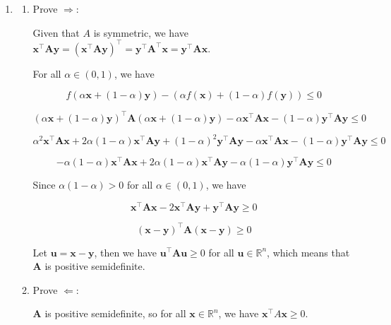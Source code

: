 \documentclass[10pt,a4paper]{article}
\begin{document}
\begin{enumerate}
    \item[1. ]
    \begin{enumerate}
        \item[] Prove $\Rightarrow$:
        
        Given that $A$ is symmetric, we have
        $\mathbf{x}^\top \mathbf{A} \mathbf{y}
        = (\mathbf{x}^\top \mathbf{A} \mathbf{y})^\top
        = \mathbf{y}^\top \mathbf{A}^\top \mathbf{x}
        = \mathbf{y}^\top \mathbf{A} \mathbf{x}$.

        For all $\alpha \in (0, 1)$, we have

        $$
        f(\alpha\mathbf{x}+(1-\alpha)\mathbf{y}) - (\alpha f(\mathbf{x})+(1-\alpha)f(\mathbf{y})) \leq 0
        $$

        $$
        (\alpha\mathbf{x}+(1-\alpha)\mathbf{y})^\top\mathbf{A}(\alpha\mathbf{x}+(1-\alpha)\mathbf{y}) - \alpha \mathbf{x}^\top\mathbf{A}\mathbf{x} - (1-\alpha) \mathbf{y}^\top\mathbf{A}\mathbf{y} \leq 0
        $$

        $$
        \alpha^2 \mathbf{x}^\top\mathbf{A}\mathbf{x} + 2\alpha(1-\alpha) \mathbf{x}^\top\mathbf{A}\mathbf{y} + (1-\alpha)^2 \mathbf{y}^\top\mathbf{A}\mathbf{y} - \alpha \mathbf{x}^\top\mathbf{A}\mathbf{x} - (1-\alpha) \mathbf{y}^\top\mathbf{A}\mathbf{y} \leq 0
        $$

        $$
        -\alpha(1-\alpha) \mathbf{x}^\top\mathbf{A}\mathbf{x} + 2\alpha(1-\alpha) \mathbf{x}^\top\mathbf{A}\mathbf{y} - \alpha(1-\alpha) \mathbf{y}^\top\mathbf{A}\mathbf{y} \leq 0
        $$

        Since $\alpha(1-\alpha) > 0$ for all $\alpha \in (0,1)$, we have
        
        $$
        \mathbf{x}^\top\mathbf{A}\mathbf{x} - 2 \mathbf{x}^\top\mathbf{A}\mathbf{y} + \mathbf{y}^\top\mathbf{A}\mathbf{y} \geq 0
        $$

        $$
        (\mathbf{x}-\mathbf{y})^\top\mathbf{A}(\mathbf{x}-\mathbf{y}) \geq 0
        $$

        Let $\mathbf{u} = \mathbf{x}-\mathbf{y}$, then we have $\mathbf{u}^\top\mathbf{A}\mathbf{u} \geq 0$ for all $\mathbf{u} \in \mathbb{R}^n$, which means that $\mathbf{A}$ is positive semidefinite.
        
        \item[] Prove $\Leftarrow$:
        
        $\mathbf{A}$ is positive semidefinite, so for all $\mathbf{x} \in \mathbb{R}^n$, we have $\mathbf{x}^\top A \mathbf{x} \geq 0$.
    

\end{enumerate}
\end{enumerate}
\end{document}
